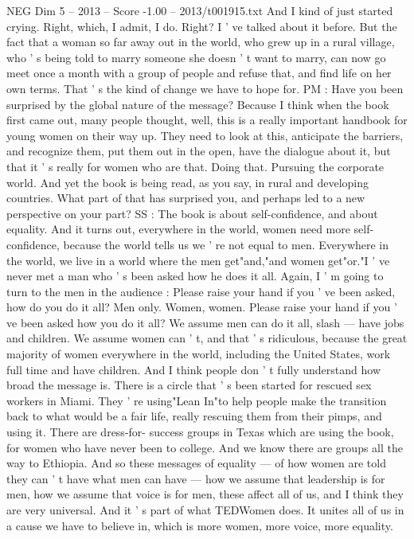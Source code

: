 \begin{textsample}{NEG Dim 5 – 2013 – Score -1.00 – 2013/t001915.txt}
And I kind of just started crying.
Right, which, I admit, I do.
Right?
I ' ve talked about it before.
But the fact that a woman so far away out in the world, who grew up in a rural village, who ' s being told to marry someone she doesn ' t want to marry, can now go meet once a month with a group of people and refuse that, and find life on her own terms.
That ' s the kind of change we have to hope for.
PM : Have you been surprised by the global nature of the message?
Because I think when the book first came out, many people thought, well, this is a really important handbook for young women on their way up.
They need to look at this, anticipate the barriers, and recognize them, put them out in the open, have the dialogue about it, but that it ' s really for women who are that.
Doing that.
Pursuing the corporate world.
And yet the book is being read, as you say, in rural and developing countries.
What part of that has surprised you, and perhaps led to a new perspective on your part?
SS : The book is about self-confidence, and about equality.
And it turns out, everywhere in the world, women need more self-confidence, because the world tells us we ' re not equal to men.
Everywhere in the world, we live in a world where the men get"and,"and women get"or."I ' ve never met a man who ' s been asked how he does it all.
Again, I ' m going to turn to the men in the audience : Please raise your hand if you ' ve been asked, how do you do it all?
Men only.
Women, women.
Please raise your hand if you ' ve been asked how you do it all?
We assume men can do it all, slash — have jobs and children.
We assume women can ' t, and that ' s ridiculous, because the great majority of women everywhere in the world, including the United States, work full time and have children.
And I think people don ' t fully understand how broad the message is.
There is a circle that ' s been started for rescued sex workers in Miami.
They ' re using"Lean In"to help people make the transition back to what would be a fair life, really rescuing them from their pimps, and using it.
There are dress-for- success groups in Texas which are using the book, for women who have never been to college.
And we know there are groups all the way to Ethiopia.
And so these messages of equality — of how women are told they can ' t have what men can have — how we assume that leadership is for men, how we assume that voice is for men, these affect all of us, and I think they are very universal.
And it ' s part of what TEDWomen does.
It unites all of us in a cause we have to believe in, which is more women, more voice, more equality.

\end{textsample}
